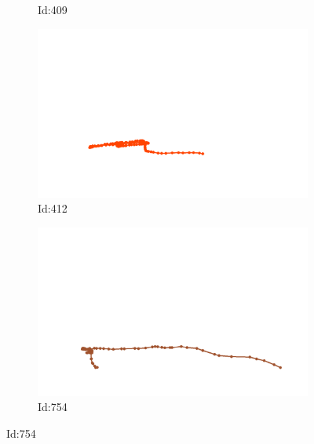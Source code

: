 \documentclass[12pt,twoside]{report}
\begin{document}
\begin{figure}
\begin{subfigure}[b]{0.20\textwidth}
\caption{Id:409}
\end{subfigure}
\begin{subfigure}[b]{0.20\textwidth}
\centering
\includegraphics[width=\textwidth]{../../trajectories/412.png}
\caption{Id:412}
\end{subfigure}
\begin{subfigure}[b]{0.20\textwidth}
\centering
\includegraphics[width=\textwidth]{../../trajectories/754.png}
\caption{Id:754}
\end{subfigure}
\end{figure}
\end{document}
